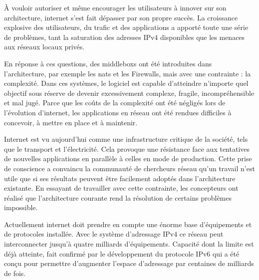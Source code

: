 À vouloir autoriser et même encourager les utilisateurs à innover sur son architecture, internet s'est fait dépasser par son propre succès. La croissance explosive des utilisateurs, du trafic et des applications a apporté toute une série de problèmes, 
tant la saturation des adresses IPv4 disponibles que les menaces aux réseaux locaux privés. 

\par
En réponse à ces questions, des \glspl{middlebox} ont été introduites dans l'architecture, par exemple les \glspl{nat} et les Firewalls, mais avec une contrainte : la complexité. Dans ces systèmes, le logiciel est capable d'atteindre n'importe quel objectif sous réserve de devenir excessivement complexe, fragile, incompréhensible et mal jugé. Parce que les coûts de la complexité ont été négligés lors de l'évolution d'internet, les applications en réseau ont été rendues difficiles à concevoir, à mettre en place et à maintenir. \cite{InternetEvolutionRoleSoftwareEngineeringRealInternet}

Internet est vu aujourd'hui comme une infrastructure critique de la société, tels que le transport et l'électricité.  Cela provoque une résistance face aux tentatives de nouvelles applications en parallèle à celles en mode de production. 
Cette prise de conscience a convaincu la communauté de chercheurs réseau qu'un travail n'est utile que si ses résultats peuvent être facilement adoptés dans l'architecture existante. 
En essayant de travailler avec cette contrainte, les concepteurs ont réalisé que l'architecture courante rend la résolution de certains problèmes impossible. \cite{OpenFlowStanfordOssification} \cite{SurveySDNIntro}

Actuellement internet doit prendre en compte une énorme base d'équipements et de protocoles installée. Avec le système d'adressage IPv4 ce réseau peut interconnecter jusqu'à quatre milliards d'équipements. Capacité dont la limite est déjà atteinte, fait confirmé par le développement du protocole IPv6 qui a été conçu pour permettre d'augmenter l'espace d'adressage par centaines de milliards de fois. \cite{ICANNIPv6Important} 


